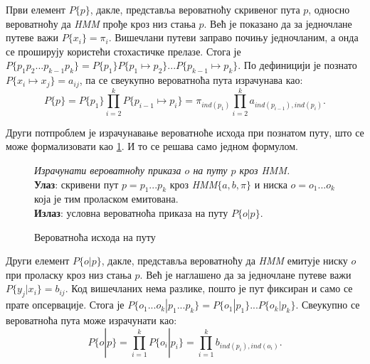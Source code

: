 \documentclass[12pt,oneside]{memoir}
\newenvironment{problem}[1][!ht]
{\renewcommand{\algorithmcfname}{Проблем}
\begin{figure}[!ht]
\centering
  \begin{minipage}{.94\linewidth}
	\begin{algorithm}[#1]%
  }{\end{algorithm}
  \end{minipage}
\end{figure}}
\begin{document}
\begin{CJK}{UTF8}{ipxm}

Први елемент $P\{p\}$, дакле, представља вероватноћу скривеног пута $p$, односно вероватноћу да \textit{HMM} прође кроз низ стања $p$. Већ је показано да за једночлане путеве важи $P\{x_i\} = \pi_i$. Вишечлани путеви заправо почињу једночланим, а онда се проширују користећи стохастичке прелазе. Стога је $P\{p_1p_2...p_{k-1}p_k\} = P\{p_1\}P\{p_1 \mapsto p_2\}...P\{p_{k-1} \mapsto p_k\}$. По дефиницији је познато $P\{x_i \mapsto x_j\} = a_{ij}$, па се свеукупно вероватноћа пута израчунава као: $$P\{p\} = P\{p_1\} \prod_{i=2}^k P\{p_{i-1} \mapsto p_i\} = \pi_{ind(p_1)} \prod_{i=2}^k a_{ind(p_{i-1}), ind(p_i)}.$$

Други потпроблем је израчунавање вероватноће исхода при познатом путу, што се може формализовати као \ref{prob:ishod}. И то се решава само једном формулом.

\begin{problem}[H]
  \SetAlgoLined
  \textit{Израчунати вероватноћу приказа $o$ на путу $p$ кроз \textit{HMM}.}\\
  \textbf{Улаз}: скривени пут $p = p_1...p_k$ кроз \textit{HMM}$\{a, b, \pi\}$ и ниска $o = o_1...o_k$ која је тим проласком емитована.\\
  \textbf{Излаз}: условна вероватноћа приказа на путу $P\{o | p\}$.
  \caption[]{Вероватноћа исхода на путу\footnotemark}
  \label{prob:ishod}
\end{problem}

Други елемент $P\{o | p\}$, дакле, представља вероватноћу да \textit{HMM} емитује ниску $o$ при проласку кроз низ стања $p$. Већ је наглашено да за једночлане путеве важи $P\{y_j | x_i\} = b_{ij}$. Код вишечланих нема разлике, пошто је пут фиксиран и само се прате опсервације. Стога је $P\{o_1...o_k | p_1...p_k\} = P\{o_1 | p_1\}...P\{o_k | p_k\}$. Свеукупно се вероватноћа пута може израчунати као: $$P\{o | p\} = \prod_{i=1}^k P\{o_i | p_i\} = \prod_{i=1}^k b_{ind(p_i), ind(o_i)}.$$



\end{CJK}
\end{document}
